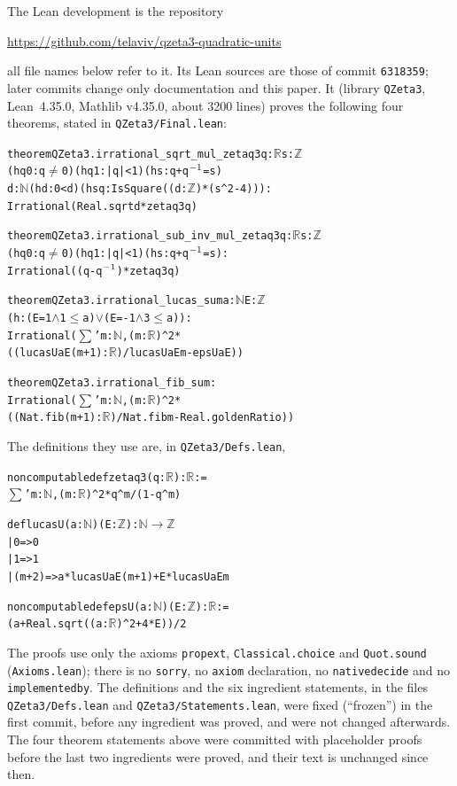 \documentclass[11pt]{amsart}
\theoremstyle{definition}
\theoremstyle{remark}
\numberwithin{equation}{section}
\newcommand{\lean}[1]{{\def\_{\textunderscore\allowbreak}\texttt{#1}}}
\begin{document}
The Lean development is the repository
\begin{center}
\url{https://github.com/telaviv/qzeta3-quadratic-units}
\end{center}
all file names below refer to it. Its Lean sources are those of commit \texttt{6318359}; later commits change only
documentation and this paper. It (library \lean{QZeta3}, Lean~4.35.0, Mathlib v4.35.0, about 3200 lines) proves
the following four theorems, stated in \lean{QZeta3/Final.lean}:
\begin{alltt}\footnotesize
theorem QZeta3.irrational_sqrt_mul_zetaq3 {}q : \(\mathbb{R}\){} {}s : \(\mathbb{Z}\){}
    (hq0 : q \(\ne\) 0) (hq1 : |q| < 1) (hs : q + q\(\sp{-1}\) = s)
    {}d : \(\mathbb{N}\){} (hd : 0 < d) (hsq : IsSquare ((d : \(\mathbb{Z}\)) * (s ^ 2 - 4))) :
    Irrational (Real.sqrt d * zetaq3 q)

theorem QZeta3.irrational_sub_inv_mul_zetaq3 {}q : \(\mathbb{R}\){} {}s : \(\mathbb{Z}\){}
    (hq0 : q \(\ne\) 0) (hq1 : |q| < 1) (hs : q + q\(\sp{-1}\) = s) :
    Irrational ((q - q\(\sp{-1}\)) * zetaq3 q)

theorem QZeta3.irrational_lucas_sum {}a : \(\mathbb{N}\){} {}E : \(\mathbb{Z}\){}
    (h : (E = 1 \(\land\) 1 \(\le\) a) \(\lor\) (E = -1 \(\land\) 3 \(\le\) a)) :
    Irrational (\(\sum\)' m : \(\mathbb{N}\), (m : \(\mathbb{R}\)) ^ 2 *
      ((lucasU a E (m + 1) : \(\mathbb{R}\)) / lucasU a E m - epsU a E))

theorem QZeta3.irrational_fib_sum :
    Irrational (\(\sum\)' m : \(\mathbb{N}\), (m : \(\mathbb{R}\)) ^ 2 *
      ((Nat.fib (m + 1) : \(\mathbb{R}\)) / Nat.fib m - Real.goldenRatio))
\end{alltt}
The definitions they use are, in \lean{QZeta3/Defs.lean},
\begin{alltt}\footnotesize
noncomputable def zetaq3 (q : \(\mathbb{R}\)) : \(\mathbb{R}\) :=
  \(\sum\)' m : \(\mathbb{N}\), (m : \(\mathbb{R}\)) ^ 2 * q ^ m / (1 - q ^ m)

def lucasU (a : \(\mathbb{N}\)) (E : \(\mathbb{Z}\)) : \(\mathbb{N}\) \(\to\) \(\mathbb{Z}\)
  | 0 => 0
  | 1 => 1
  | (m + 2) => a * lucasU a E (m + 1) + E * lucasU a E m

noncomputable def epsU (a : \(\mathbb{N}\)) (E : \(\mathbb{Z}\)) : \(\mathbb{R}\) :=
  (a + Real.sqrt ((a : \(\mathbb{R}\)) ^ 2 + 4 * E)) / 2
\end{alltt}
The proofs use only the axioms \lean{propext}, \lean{Classical.choice} and \lean{Quot.sound} (\lean{Axioms.lean});
there is no \lean{sorry}, no \lean{axiom} declaration, no \lean{native\_decide} and no \lean{implemented\_by}.
The definitions and the six ingredient statements, in the files \lean{QZeta3/Defs.lean} and
\lean{QZeta3/Statements.lean}, were fixed (``frozen'') in the first commit, before any ingredient was proved, and
were not changed afterwards. The four theorem statements above were committed with placeholder proofs before the last
two ingredients were proved, and their text is unchanged since then.
\end{document}
